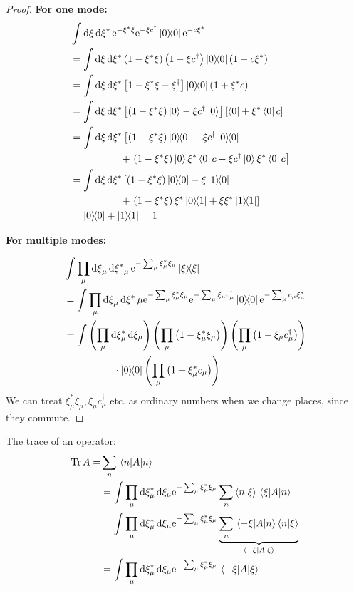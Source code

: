 \begin{proof}
\underline{\textbf{For one mode:}}
\begin{align*}
&\int \dxi\dxis\e^{-\xi^*\xi}\e^{-\xi c^\dagger}\dyad 0\e^{-c\xi^*}& \\
&=\int \dxi\dxis \left(1-\xi^*\xi\right)\left(1-\xi c^\dagger\right)\dyad 0 \left(1-c\xi^*\right)\\
&=\int \dxi\dxis \left[1-\xi^*\xi -\xi ^\dagger\right]\dyad 0 \left(1+\xi^* c\right)\\
&=\int \dxi\dxis\left[\left(1-\xi^*\xi\right)\ket 0 - \xi c^\dagger \ket 0\right]\left[\bra 0 + \xi^*\bra 0 c\right] \\
&= \int \dxi\dxis \left[\left( 1-\xi^*\xi\right)\dyad 0 -\xi c^\dagger \dyad 0 \right. \\
&\qquad\qquad\quad +\left.\left(1-\xi^*\xi\right)\ket 0\xi^*\bra 0 c - \xi c^\dagger\ket 0\xi^*\bra 0 c\right] \\
&=\int \dxi\dxis \left[\left(1-\xi^*\xi\right)\dyad 0 -\xi \dyad{1}{0} \right.\\
&\qquad\qquad\quad +\left.\left(1-\xi^*\xi\right)\xi^*\dyad{0}{1} + \xi\xi^* \dyad 1\right]\\
&= \dyad 0 + \dyad 1 = 1
\end{align*}

\underline{\textbf{For multiple modes:}}

\begin{align*}
&\int \prod_\mu \dxi_\mu \dxis_\mu \e^{-\sum_\mu \xi_\mu^* \xi_\mu}\dyad \xi \\
&=\int \prod_\mu\dxi_\mu\dxis\mu\e^{-\sum_\mu\xi_\mu^*\xi_\mu}\e^{-\sum_\mu\xi_\mu c_\mu^\dagger}\dyad 0\e^{-\sum_\mu c_\mu\xi_\mu^*}\\
&= \int \left(\prod_{\mu}\dd{\xi_\mu^*}\dd{\xi_\mu}\right)\left(\prod_\mu\left(1-\xi_\mu^*\xi_\mu\right)\right)\left(\prod_\mu\left(1-\xi_\mu c_\mu^\dagger\right)\right) \\
&\qquad\qquad\quad \cdot \dyad 0 \left(\prod_\mu\left(1+\xi_\mu^* c_\mu\right)\right)
\end{align*}
We can treat \(\xi_\mu^*\xi_\mu, \xi_\mu c_\mu^\dagger\) etc. as ordinary numbers when we change places, since they commute.

\end{proof}

The trace of an operator:
\begin{align}
\label{eq:Trace_fermion_coherent}
\Tr A =&\sum_n\ev{A}{n} \nonumber \\
&= \int \prod_{\mu}\dd{\xi_\mu^*}\dd{\xi_\mu \e^{-\sum_\mu\xi_\mu^*\xi_\mu}}\sum_n\braket{n}{\xi}\mel{\xi}{A}{n}\nonumber \\
&=\int \prod_{\mu}\dd{\xi_\mu^*}\dd{\xi_\mu \e^{-\sum_\mu\xi_\mu^*\xi_\mu}}\underbrace{\sum_n \mel{-\xi}{A}{n}\braket{n}{\xi}}_{\mel{-\xi}{A}{\xi}} \nonumber\\
&=\int \prod_{\mu}\dd{\xi_\mu^*}\dd{\xi_\mu \e^{-\sum_\mu\xi_\mu^*\xi_\mu}}\mel{-\xi}{A}{\xi} 
\end{align}

